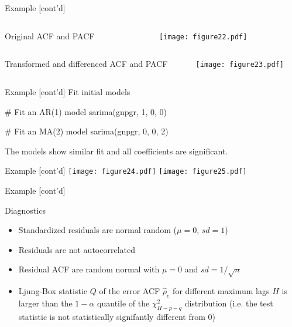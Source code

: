 \documentclass[ignorenonframetext,xcolor=x11names]{beamer}
\begin{document}
\begin{frame}{Example \small [cont'd]}
\begin{columns}
\begin{column}{0.15\textwidth}
\small
Original ACF and PACF
\end{column}
\begin{column}{0.75\textwidth}
\texttt{[image: figure22.pdf]}
\end{column}
\end{columns}

\begin{columns}
\begin{column}{0.15\textwidth}
\small
Transformed and differenced ACF and PACF
\end{column}
\begin{column}{0.75\textwidth}
\texttt{[image: figure23.pdf]}
\end{column}
\end{columns}
\end{frame}

\begin{frame}[fragile]{Example \small [cont'd]}
Fit initial models
\begin{Rcode}
# Fit an AR(1) model
sarima(gnpgr, 1, 0, 0)

# Fit an MA(2) model
sarima(gnpgr, 0, 0, 2)
\end{Rcode}

The models show similar fit and all coefficients are significant.
\end{frame}

\begin{frame}{Example \small [cont'd]}
\centering
\texttt{[image: figure24.pdf]}
\texttt{[image: figure25.pdf]}
\end{frame}

\begin{frame}{Example \small [cont'd]}
\begin{block}{Diagnostics}
\begin{itemize}
   \item Standardized residuals are normal random ($\mu=0$, $sd=1$)
   \item Residuals are not autocorrelated
   \item Residual ACF are random normal with $\mu=0$ and $sd=1/\sqrt{n}$
   \item Ljung-Box statistic $Q$ of the error ACF $\hat\rho_e$ for different maximum lags $H$ is larger than the $1-\alpha$ quantile of the $\chi^2_{H-p-q}$ distribution (i.e. the test statistic is not statistically signifantly different from $0$)
\end{itemize}
\end{block}
\end{frame}
\end{document}
